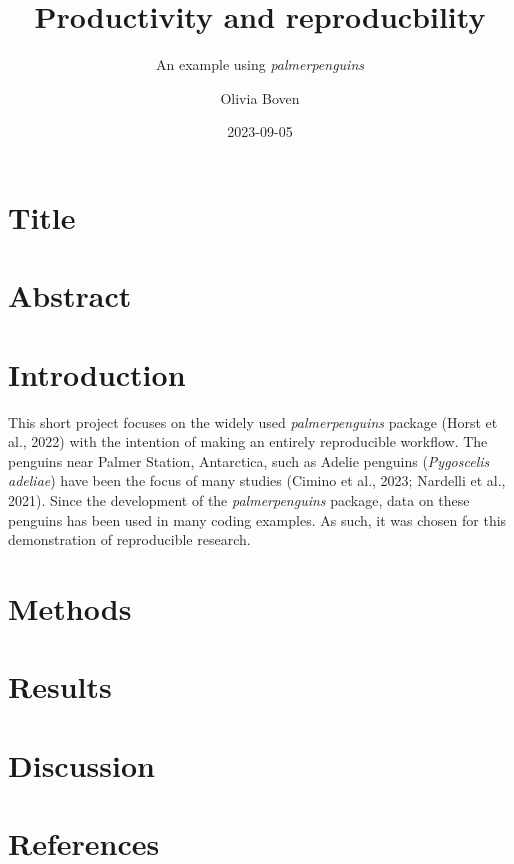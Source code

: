 \documentclass[
]{article}
\title{Productivity and reproducbility}
\subtitle{An example using \emph{palmerpenguins}}
\author{Olivia Boven}
\date{2023-09-05}
\begin{document}
\maketitle

\hypertarget{title}{%
\section{Title}\label{title}}

\newpage

\hypertarget{abstract}{%
\section{Abstract}\label{abstract}}

\newpage

\hypertarget{introduction}{%
\section{Introduction}\label{introduction}}

This short project focuses on the widely used \emph{palmerpenguins}
package (Horst et al., 2022) with the intention of making an entirely
reproducible workflow. The penguins near Palmer Station, Antarctica,
such as Adelie penguins (\emph{Pygoscelis adeliae}) have been the focus
of many studies (Cimino et al., 2023; Nardelli et al., 2021). Since the
development of the \emph{palmerpenguins} package, data on these penguins
has been used in many coding examples. As such, it was chosen for this
demonstration of reproducible research.

\hypertarget{methods}{%
\section{Methods}\label{methods}}

\hypertarget{results}{%
\section{Results}\label{results}}

\hypertarget{discussion}{%
\section{Discussion}\label{discussion}}

\hypertarget{references}{%
\section{References}\label{references}}
\end{document}
